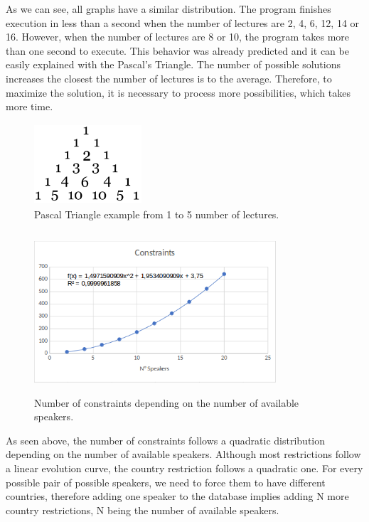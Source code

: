 \documentclass[runningheads,a4paper]{llncs}
\begin{document}
\clearpage
As we can see, all graphs have a similar distribution. The program finishes execution in less than a second when the number of lectures are  2, 4, 6, 12, 14 or 16. However, when the number of lectures are 8 or 10, the program takes more than one second to execute. This behavior was already predicted and it can be easily explained with the Pascal's Triangle. The number of possible solutions increases the closest the number of lectures is to the average. Therefore, to maximize the solution, it is necessary to process more possibilities, which takes more time.

\begin{figure}[!ht]
\centering
\includegraphics[width=4cm,height=3cm]{Pascal}
\caption{Pascal Triangle example from 1 to 5 number of lectures.}
\label{fig:Pascal Triangle}
\end{figure}

\begin{figure}[!ht]
\centering
\includegraphics[width=9cm,height=6cm]{Constraints}
\caption{Number of constraints depending on the number of available speakers.}
\label{fig:Constraints}
\end{figure}

As seen above, the number of constraints follows a quadratic distribution depending on the number of available speakers. Although most restrictions follow a linear evolution curve, the country restriction follows a quadratic one. For every possible pair of possible speakers, we need to force them to have different countries, therefore adding one speaker to the database implies adding N more country restrictions, N being the number of available speakers.
\end{document}
